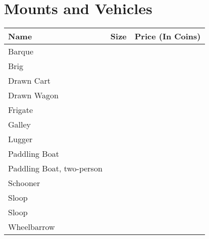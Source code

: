 \section{Mounts and Vehicles}\label{sec:mountsVehicles}
\begin{longtable}{l | r | r}
	Name & Size & Price (In Coins)\\ \hline
	Barque  &  &  \\
	Brig  &  &  \\
	Drawn Cart  &  &  \\
	Drawn Wagon  &  &  \\
	Frigate  &  &  \\
	Galley  &  &  \\
	Lugger  &  &  \\
	Paddling Boat  &  &  \\
	Paddling Boat, two-person  &  &  \\
	Schooner  &  &  \\
	Sloop  &  &  \\
	Sloop  &  &  \\
	Wheelbarrow  &  &  \\
\end{longtable}
